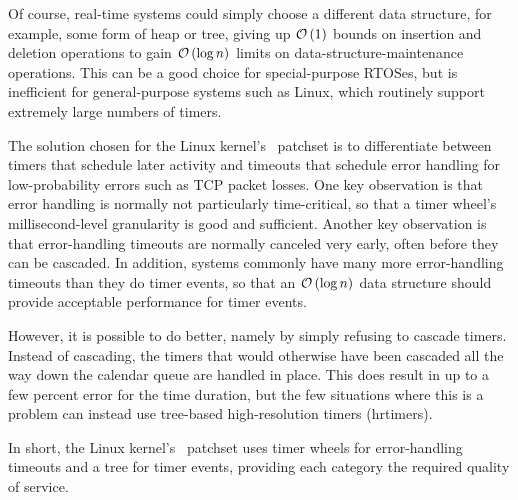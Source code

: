 
Of course, real-time systems could simply choose a different data
structure, for example, some form of heap or tree, giving up
$\mathcal{O}\left(1\right)$ bounds on insertion and deletion operations to gain $\mathcal{O}\left(\log n\right)$
limits on data-structure-maintenance operations.
This can be a good choice for special-purpose RTOSes, but is inefficient
for general-purpose systems such as Linux, which routinely support
extremely large numbers of timers.

The solution chosen for the Linux kernel's \rt\ patchset is to differentiate
between timers that schedule later activity and timeouts that schedule
error handling for low-probability errors such as TCP packet losses.
One key observation is that error handling is normally not particularly
time-critical, so that a timer wheel's millisecond-level granularity
is good and sufficient.
Another key observation is that error-handling timeouts are normally
canceled very early, often before they can be cascaded.
In addition, systems commonly have many more error-handling timeouts
than they do timer events, so that an $\mathcal{O}\left(\log n\right)$ data structure should
provide acceptable performance for timer events.

However, it is possible to do better, namely by simply refusing to
cascade timers.
Instead of cascading, the timers that would otherwise have been cascaded
all the way down the calendar queue are handled in place.
This does result in up to a few percent error for the time duration,
but the few situations where this is a problem can instead use tree-based
high-resolution timers (hrtimers).

In short, the Linux kernel's \rt\ patchset uses timer wheels for
error-handling timeouts and a tree for timer events, providing each
category the required quality of service.

